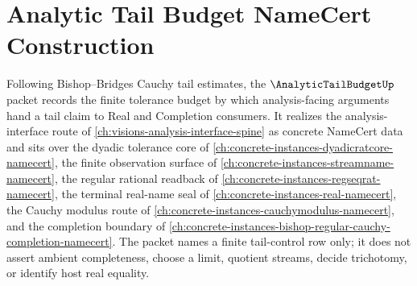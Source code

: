 \chapter{Analytic Tail Budget NameCert Construction}
\label{ch:concrete-instances-analytic-tail-budget-namecert}

Following Bishop--Bridges Cauchy tail estimates, the $\AnalyticTailBudgetUp$ packet records the finite tolerance budget by which analysis-facing arguments hand a tail claim to Real and Completion consumers. It realizes the analysis-interface route of \autoref{ch:visions-analysis-interface-spine} as concrete NameCert data and sits over the dyadic tolerance core of \autoref{ch:concrete-instances-dyadicratcore-namecert}, the finite observation surface of \autoref{ch:concrete-instances-streamname-namecert}, the regular rational readback of \autoref{ch:concrete-instances-regseqrat-namecert}, the terminal real-name seal of \autoref{ch:concrete-instances-real-namecert}, the Cauchy modulus route of \autoref{ch:concrete-instances-cauchymodulus-namecert}, and the completion boundary of \autoref{ch:concrete-instances-bishop-regular-cauchy-completion-namecert}. The packet names a finite tail-control row only; it does not assert ambient completeness, choose a limit, quotient streams, decide trichotomy, or identify host real equality.

